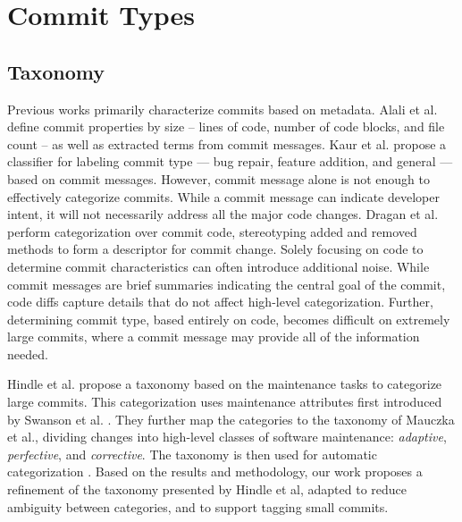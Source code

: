 \section{Commit Types}
\label{sec:type}

\subsection{Taxonomy}
Previous works primarily characterize commits based on metadata.
Alali et al.\cite{Alali} define commit properties by size -- lines of code, number of code blocks, and file count -- as well as extracted terms from commit messages.
Kaur et al. \cite{Kaur2018} propose a classifier for labeling commit type --- bug repair, feature addition, and general --- based on commit messages.
However, commit message alone is not enough to effectively categorize commits. While a commit message can indicate developer intent, it will not necessarily address all the major code changes. 
Dragan et al. \cite{Dragan} perform categorization over commit code, stereotyping added and removed methods to form a descriptor for commit change.
Solely focusing on code to determine commit characteristics can often introduce additional noise. While commit messages are brief summaries indicating the central goal of the commit, code diffs capture details that do not affect high-level categorization. Further, determining commit type, based entirely on code, becomes difficult on extremely large commits, where a commit message may provide all of the information needed.

Hindle et al. \cite{Hindle_cate} propose a taxonomy based on the maintenance tasks to categorize large commits.
This categorization uses maintenance attributes first introduced by Swanson et al. \cite{Swanson}.
They further map the categories to the taxonomy of Mauczka et al.\cite{Mauczka}, dividing changes into high-level classes of software maintenance: \textit{adaptive}, \textit{perfective}, and \textit{corrective}. The taxonomy is then used for automatic categorization \cite{Hindle_auto}. Based on the results and methodology, our work proposes a refinement of the taxonomy presented by Hindle et al, adapted to reduce ambiguity between categories, and to support tagging small commits.



